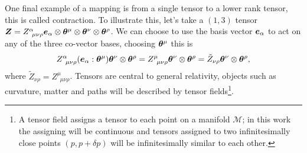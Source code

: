 One final example of a mapping is from a single tensor to a lower rank tensor, this is called contraction. To illustrate this, let's take a $(1,3)$ tensor $\boldsymbol{Z} = Z^\alpha_{\,\,\,\mu\nu\rho} \boldsymbol{e}_\alpha \otimes\boldsymbol{\theta}^\mu\otimes\boldsymbol{\theta}^\nu\otimes\boldsymbol{\theta}^\rho$. We can choose to use the basis vector $\boldsymbol{e}_\alpha$ to act on any of the three co-vector bases, choosing $\boldsymbol{\theta}^\mu$ this is
\begin{equation}
Z^\alpha_{\,\,\,\mu\nu\rho} (\boldsymbol{e}_\alpha : \boldsymbol{\theta}^\mu)\boldsymbol{\theta}^\nu\otimes\boldsymbol{\theta}^\rho = Z^\mu_{\,\,\,\mu\nu\rho}\boldsymbol{\theta}^\nu\otimes\boldsymbol{\theta}^\rho = \tilde{Z}_{\nu\rho}\boldsymbol{\theta}^\nu\otimes\boldsymbol{\theta}^\rho,
\end{equation} 
where $\tilde{Z}_{\nu\rho} = Z^\mu_{\,\,\,\mu\nu\rho}$. Tensors are central to general relativity, objects such as curvature, matter and paths will be described by tensor fields\footnote{A tensor field assigns a tensor to each point on a manifold $\mathcal{M}$; in this work the assigning will be continuous and tensors assigned to two infinitesimally close points $(p,p+\delta p)$ will be infinitesimally similar to each other.}. 





